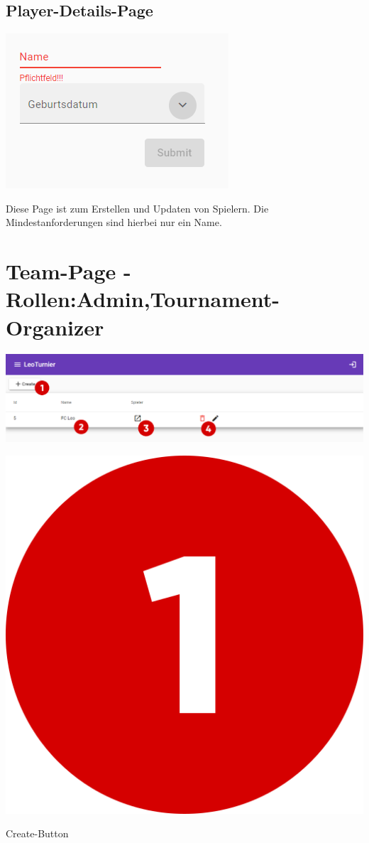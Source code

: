\bigskip
\subsection{Player-Details-Page}
\includegraphics[]{pics/user-guide/player-create-page.PNG}

Diese Page ist zum Erstellen und Updaten von Spielern. Die Mindestanforderungen sind hierbei nur ein Name.


\section{Team-Page - Rollen:Admin,Tournament-Organizer}
\includegraphics[scale=0.44]{pics/user-guide/team-overview-page.PNG}
\bigskip

\includegraphics[scale=0.05]{pics/user-guide/numbers/number-1.png} \begin{LARGE} Create-Button \end{LARGE}

